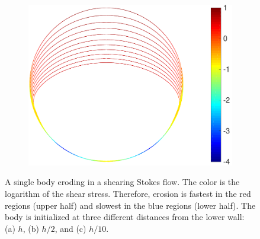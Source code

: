 \documentclass{jfm}
\begin{document}
\begin{figure}
\begin{center}
\begin{subfigure}[b]{0.27\textwidth}
\caption{}
\end{subfigure}
\begin{subfigure}[b]{0.27\textwidth}
\includegraphics[height = \textwidth]{./figs/1b_0d4r0d1h_shear}
\caption{}
\end{subfigure}
\end{center}
\caption{\label{fig:NearWall} A single body eroding in a shearing Stokes
flow.  The color is the logarithm of the shear stress. Therefore,
erosion is fastest in the red regions (upper half) and slowest in the
blue regions (lower half).  The body is initialized at three different
distances from the lower wall: (a) $h$, (b) $h/2$, and (c) $h/10$.}
\end{figure}
\end{document}
